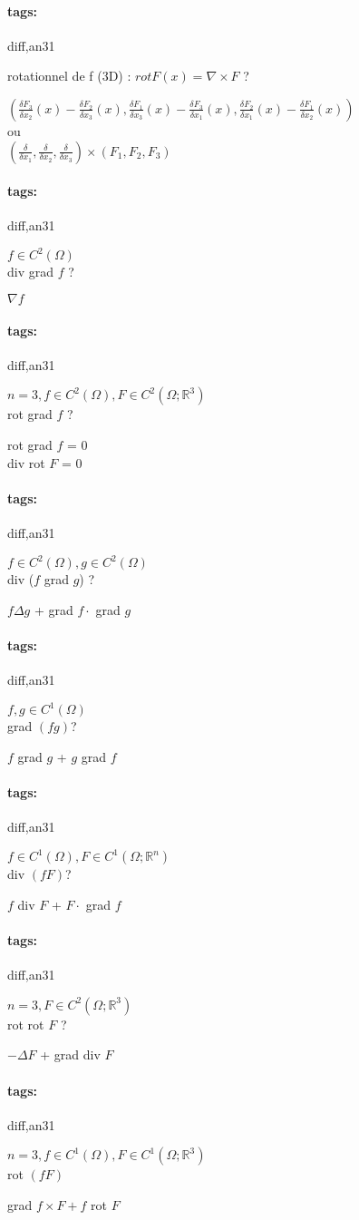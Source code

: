 \documentclass[12pt]{article}
\newcommand*{\xfield}[1]{\begin{mdframed}\centering #1\end{mdframed}\bigskip}
\newenvironment{note}{}{}
\newcommand*{\tags}[1]{\paragraph{tags: }#1}
\begin{document}
\begin{note}
	\tags{diff,an3}1
	\xfield{rotationnel de f (3D) : $rot F(x) = \nabla \times F$ ?}
	\xfield{$\left(\frac{\delta F_3}{\delta x_2}(x)-\frac{\delta F_2}{\delta x_3}(x),
	\frac{\delta F_1}{\delta x_3}(x)-\frac{\delta F_3}{\delta x_1}(x),
	\frac{\delta F_2}{\delta x_1}(x)-\frac{\delta F_1}{\delta x_2}(x)\right)$ \\
	ou \\
	$\left( \frac{\delta}{\delta x_1}, \frac{\delta}{\delta x_2}, \frac{\delta}{\delta x_3} \right) \times \left(F_1,F_2,F_3\right)$}
\end{note}

\begin{note}
	\tags{diff,an3}1
	\xfield{$f \in C^2(\Omega)$  \\
	div grad $f$ ?}
	\xfield{$\nabla f$}
\end{note}

\begin{note}
	\tags{diff,an3}1
	\xfield{$n=3,f \in C^2(\Omega) , F \in C^2(\Omega;\mathbb{R}^3 )$ \\
	rot grad $f$ ?}
	\xfield{rot grad $f$ = 0 \\ 
	div rot $F$ = 0}
\end{note}

\begin{note}
	\tags{diff,an3}1
	\xfield{$f \in C^2(\Omega),g \in C^2(\Omega)$  \\
	div ($f$ grad $g$) ?}
	\xfield{$f\Delta g$ + grad $f \cdot$ grad $g$}
\end{note}

\begin{note}
	\tags{diff,an3}1
	\xfield{$f,g \in C^1(\Omega)$ \\
	grad $(fg)$?}
	\xfield{$f$ grad $g$ + $g$ grad $f$}
\end{note}

\begin{note}
	\tags{diff,an3}1
	\xfield{$f \in C^1(\Omega) , F \in C^1(\Omega;\mathbb{R}^n )$  \\
	div $(fF)$?}
	\xfield{$f$ div $F$ + $F \cdot$ grad $f$}
\end{note}

\begin{note}
	\tags{diff,an3}1
	\xfield{$n=3, F \in C^2(\Omega;\mathbb{R}^3 )$ \\
	rot rot $F$ ?}
	\xfield{$-\Delta F$ + grad div $F$}
\end{note}

\begin{note}
	\tags{diff,an3}1
	\xfield{$n=3, f \in C^1(\Omega) , F \in C^1(\Omega;\mathbb{R}^3)$ \\
	rot $(fF)$}
	\xfield{grad $f \times F + f$ rot $F$}
\end{note}
\end{document}
